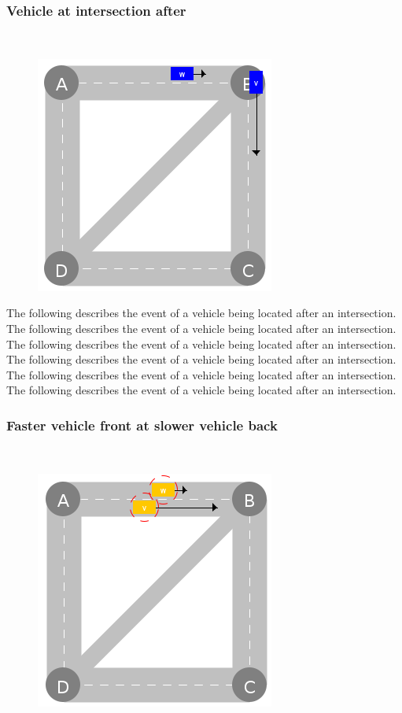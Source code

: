 \documentclass[graybox]{svmult}
\begin{document}
\subsubsection{Vehicle at intersection after}
\
\begin{figure}
	\centering
		\includegraphics[scale=0.35]{../../events/vehicle-at-intersection-after.png}
\end{figure}
The following describes the event of a vehicle being located after an intersection. 
The following describes the event of a vehicle being located after an intersection. 
The following describes the event of a vehicle being located after an intersection. 
The following describes the event of a vehicle being located after an intersection. 
The following describes the event of a vehicle being located after an intersection. 
The following describes the event of a vehicle being located after an intersection. 

\subsubsection{Faster vehicle front at slower vehicle back}
\
\begin{figure}
	\centering
		\includegraphics[scale=0.35]{../../events/faster-vehicle-front-at-slower-vehicle-back.png}
\end{figure}
\end{document}
